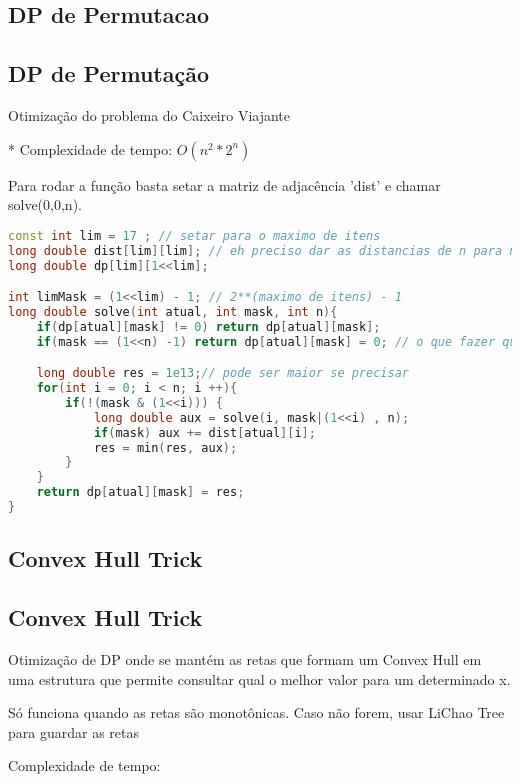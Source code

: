 \documentclass[11pt, a4paper, twoside]{article}
\begin{document}
\subsection{DP de Permutacao}

\subsection{DP de Permutação}



Otimização do problema do Caixeiro Viajante

* Complexidade de tempo: $O(n^2 * 2^n)$

Para rodar a função basta setar a matriz de adjacência 'dist' e chamar solve(0,0,n).

\begin{lstlisting}[language=C++]
const int lim = 17 ; // setar para o maximo de itens
long double dist[lim][lim]; // eh preciso dar as distancias de n para n
long double dp[lim][1<<lim];

int limMask = (1<<lim) - 1; // 2**(maximo de itens) - 1
long double solve(int atual, int mask, int n){
    if(dp[atual][mask] != 0) return dp[atual][mask];
    if(mask == (1<<n) -1) return dp[atual][mask] = 0; // o que fazer quando chega no final 

    long double res = 1e13;// pode ser maior se precisar
    for(int i = 0; i < n; i ++){
        if(!(mask & (1<<i))) {
            long double aux = solve(i, mask|(1<<i) , n);
            if(mask) aux += dist[atual][i];
            res = min(res, aux);
        }
    }
    return dp[atual][mask] = res;
}
\end{lstlisting}

\subsection{Convex Hull Trick}

\subsection{Convex Hull Trick}


Otimização de DP onde se mantém as retas que formam um Convex Hull em uma estrutura que permite consultar qual o melhor valor para um determinado x.

Só funciona quando as retas são monotônicas. Caso não forem, usar LiChao Tree para guardar as retas

Complexidade de tempo:
\end{document}
